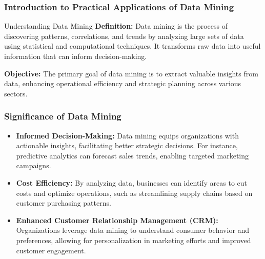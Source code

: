 \documentclass[aspectratio=169]{beamer}
\begin{document}
\frame{\titlepage}

\begin{frame}[fragile]
    \frametitle{Introduction to Practical Applications of Data Mining}
    \begin{block}{Understanding Data Mining}
        \textbf{Definition:} Data mining is the process of discovering patterns, correlations, and trends by analyzing large sets of data using statistical and computational techniques. It transforms raw data into useful information that can inform decision-making.

        \textbf{Objective:} The primary goal of data mining is to extract valuable insights from data, enhancing operational efficiency and strategic planning across various sectors.
    \end{block}
\end{frame}

\begin{frame}[fragile]
    \frametitle{Significance of Data Mining}
    \begin{itemize}
        \item \textbf{Informed Decision-Making:} 
        Data mining equips organizations with actionable insights, facilitating better strategic decisions. For instance, predictive analytics can forecast sales trends, enabling targeted marketing campaigns.
        
        \item \textbf{Cost Efficiency:} 
        By analyzing data, businesses can identify areas to cut costs and optimize operations, such as streamlining supply chains based on customer purchasing patterns.

        \item \textbf{Enhanced Customer Relationship Management (CRM):} 
        Organizations leverage data mining to understand consumer behavior and preferences, allowing for personalization in marketing efforts and improved customer engagement.
    \end{itemize}
\end{frame}
\end{document}
